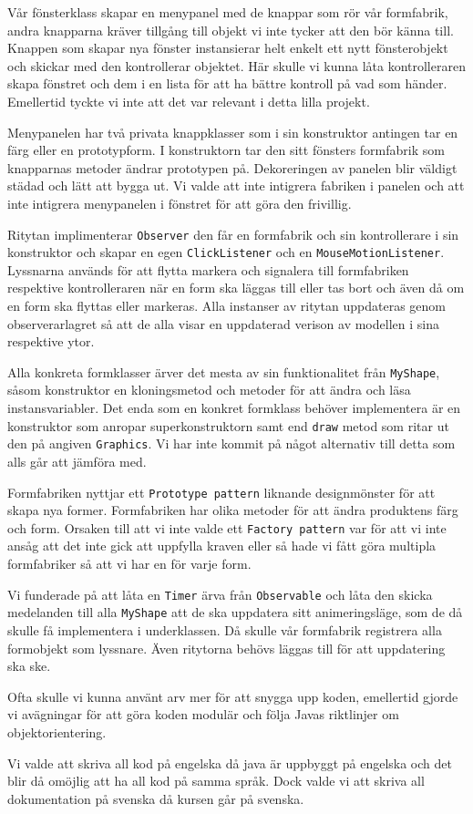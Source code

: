 \documentclass[a4paper,8pt]{article}
\begin{document}
Vår fönsterklass skapar en menypanel med de knappar som rör vår formfabrik, 
andra knapparna kräver tillgång till objekt vi inte tycker att den bör 
känna till. Knappen som skapar nya fönster instansierar helt enkelt ett nytt
fönsterobjekt och skickar med den kontrollerar objektet. Här skulle vi kunna
låta kontrolleraren skapa fönstret och dem i en lista för att ha bättre 
kontroll på vad som händer. Emellertid tyckte vi inte att det var relevant i 
detta lilla projekt.

Menypanelen har två privata knappklasser som i sin konstruktor antingen
tar en färg eller en prototypform. I konstruktorn tar den sitt fönsters 
formfabrik som knapparnas metoder ändrar prototypen på. Dekoreringen av panelen
blir väldigt städad och lätt att bygga ut. Vi valde att inte intigrera fabriken
i panelen och att inte intigrera menypanelen i fönstret för att göra den
frivillig.

Ritytan implimenterar \texttt{Observer} den får en formfabrik och sin 
kontrollerare i sin konstruktor och skapar en egen \texttt{ClickListener} och
en \texttt{MouseMotionListener}. Lyssnarna används för att flytta markera och
signalera till formfabriken respektive kontrolleraren när en form ska läggas 
till eller tas bort och även då om en form ska flyttas eller markeras.
Alla instanser av ritytan uppdateras genom observerarlagret så att de alla
visar en uppdaterad verison av modellen i sina respektive ytor.

Alla konkreta formklasser ärver det mesta av sin funktionalitet från 
\texttt{MyShape}, såsom konstruktor en kloningsmetod och metoder för att 
ändra och läsa instansvariabler. Det enda som en konkret formklass behöver 
implementera är en konstruktor som anropar superkonstruktorn samt end 
\texttt{draw} metod som ritar ut den på angiven \texttt{Graphics}. Vi har inte 
kommit på något alternativ till detta som alls går att jämföra med.

Formfabriken nyttjar ett \texttt{Prototype pattern} liknande designmönster
för att skapa nya former. Formfabriken har olika metoder för att ändra
produktens färg och form. Orsaken till att vi inte valde ett 
\texttt{Factory pattern} var för att vi inte ansåg att det inte gick att
uppfylla kraven eller så hade vi fått göra multipla formfabriker så att vi
har en för varje form.

Vi funderade på att låta en \texttt{Timer} ärva från \texttt{Observable} och
låta den skicka medelanden till alla \texttt{MyShape} att de ska uppdatera sitt
animeringsläge, som de då skulle få implementera i underklassen. Då skulle vår
formfabrik registrera alla formobjekt som lyssnare. Även ritytorna behövs läggas
till för att uppdatering ska ske.

Ofta skulle vi kunna använt arv mer för att snygga upp koden, emellertid 
gjorde vi avägningar för att göra koden modulär och följa Javas riktlinjer om
objektorientering.

Vi valde att skriva all kod på engelska då java är uppbyggt på engelska och det
blir då omöjlig att ha all kod på samma språk. Dock valde vi att skriva all
dokumentation på svenska då kursen går på svenska.
\end{document}
